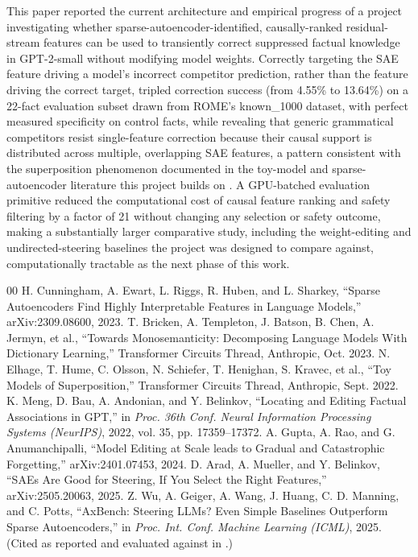 \documentclass[conference]{IEEEtran}
\begin{document}
This paper reported the current architecture and empirical progress of a project investigating whether sparse-autoencoder-identified, causally-ranked residual-stream features can be used to transiently correct suppressed factual knowledge in GPT-2-small without modifying model weights. Correctly targeting the SAE feature driving a model's incorrect competitor prediction, rather than the feature driving the correct target, tripled correction success (from 4.55\% to 13.64\%) on a 22-fact evaluation subset drawn from ROME's known\_1000 dataset, with perfect measured specificity on control facts, while revealing that generic grammatical competitors resist single-feature correction because their causal support is distributed across multiple, overlapping SAE features, a pattern consistent with the superposition phenomenon documented in the toy-model and sparse-autoencoder literature this project builds on \cite{cunningham2023sparse, bricken2023towards, elhage2022superposition}. A GPU-batched evaluation primitive reduced the computational cost of causal feature ranking and safety filtering by a factor of 21 without changing any selection or safety outcome, making a substantially larger comparative study, including the weight-editing and undirected-steering baselines the project was designed to compare against, computationally tractable as the next phase of this work.

\begin{thebibliography}{00}
 H. Cunningham, A. Ewart, L. Riggs, R. Huben, and L. Sharkey, ``Sparse Autoencoders Find Highly Interpretable Features in Language Models,'' arXiv:2309.08600, 2023.
 T. Bricken, A. Templeton, J. Batson, B. Chen, A. Jermyn, et al., ``Towards Monosemanticity: Decomposing Language Models With Dictionary Learning,'' Transformer Circuits Thread, Anthropic, Oct. 2023.
 N. Elhage, T. Hume, C. Olsson, N. Schiefer, T. Henighan, S. Kravec, et al., ``Toy Models of Superposition,'' Transformer Circuits Thread, Anthropic, Sept. 2022.
 K. Meng, D. Bau, A. Andonian, and Y. Belinkov, ``Locating and Editing Factual Associations in GPT,'' in \textit{Proc. 36th Conf. Neural Information Processing Systems (NeurIPS)}, 2022, vol. 35, pp. 17359--17372.
 A. Gupta, A. Rao, and G. Anumanchipalli, ``Model Editing at Scale leads to Gradual and Catastrophic Forgetting,'' arXiv:2401.07453, 2024.
 D. Arad, A. Mueller, and Y. Belinkov, ``SAEs Are Good for Steering, If You Select the Right Features,'' arXiv:2505.20063, 2025.
 Z. Wu, A. Geiger, A. Wang, J. Huang, C. D. Manning, and C. Potts, ``AxBench: Steering LLMs? Even Simple Baselines Outperform Sparse Autoencoders,'' in \textit{Proc. Int. Conf. Machine Learning (ICML)}, 2025. (Cited as reported and evaluated against in \cite{arad2025steering}.)
\end{thebibliography}
\end{document}
